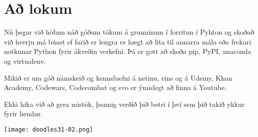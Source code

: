 \section{Að lokum}\label{Að lokum}

Nú þegar við höfum náð góðum tökum á grunninum í forritun í Pyhton og skoðað við hverju má búast ef farið er lengra er hægt að líta til annarra mála eða frekari notkunar Python fyrir ákveðin verkefni.
Þá er gott að skoða pip, PyPI, anaconda og virtualenv.

Mikið er um góð námskeið og kennsluefni á netinu, eins og á Udemy, Khan Academy, Codewars, Codecombat og svo er ýmislegt að finna á Youtube.

Ekki hika við að gera mistök, þannig verðið þið betri í því sem þið takið ykkur fyrir hendur. 

	\begin{center}
		\texttt{[image: doodles31-02.png]}
	\end{center}